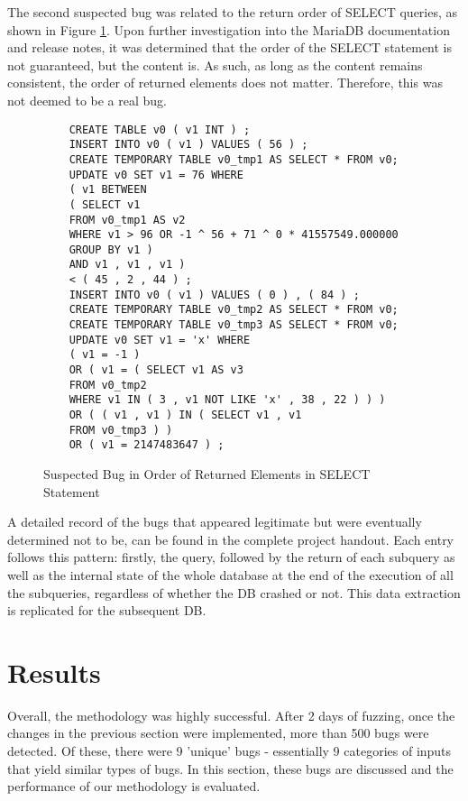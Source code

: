 \documentclass[sigconf]{acmart}
\begin{document}
The second suspected bug was related to the return order of SELECT queries, as shown in Figure \ref{fig:bug_order}. Upon further investigation into the MariaDB documentation and release notes, it was determined that the order of the SELECT statement is not guaranteed, but the content is. As such, as long as the content remains consistent, the order of returned elements does not matter. Therefore, this was not deemed to be a real bug.
\begin{figure}[h]
    \centering
    \begin{verbatim}
    CREATE TABLE v0 ( v1 INT ) ;
    INSERT INTO v0 ( v1 ) VALUES ( 56 ) ;
    CREATE TEMPORARY TABLE v0_tmp1 AS SELECT * FROM v0;
    UPDATE v0 SET v1 = 76 WHERE
    ( v1 BETWEEN
    ( SELECT v1
    FROM v0_tmp1 AS v2
    WHERE v1 > 96 OR -1 ^ 56 + 71 ^ 0 * 41557549.000000
    GROUP BY v1 )
    AND v1 , v1 , v1 )
    < ( 45 , 2 , 44 ) ;
    INSERT INTO v0 ( v1 ) VALUES ( 0 ) , ( 84 ) ;
    CREATE TEMPORARY TABLE v0_tmp2 AS SELECT * FROM v0;
    CREATE TEMPORARY TABLE v0_tmp3 AS SELECT * FROM v0;
    UPDATE v0 SET v1 = 'x' WHERE
    ( v1 = -1 )
    OR ( v1 = ( SELECT v1 AS v3
    FROM v0_tmp2
    WHERE v1 IN ( 3 , v1 NOT LIKE 'x' , 38 , 22 ) ) )
    OR ( ( v1 , v1 ) IN ( SELECT v1 , v1
    FROM v0_tmp3 ) )
    OR ( v1 = 2147483647 ) ;
    \end{verbatim}
    \caption{Suspected Bug in Order of Returned Elements in SELECT Statement}
    \label{fig:bug_order}
    \end{figure}
A detailed record of the bugs that appeared legitimate but were eventually determined not to be, can be found in the complete project handout. Each entry follows this pattern: firstly, the query, followed by the return of each subquery as well as the internal state of the whole database at the end of the execution of all the subqueries, regardless of whether the DB crashed or not. This data extraction is replicated for the subsequent DB.



\section{Results}
Overall, the methodology was highly successful. After 2 days of fuzzing, once the changes in the previous section were implemented, more than 500 bugs were detected. Of these, there were 9 'unique' bugs - essentially 9 categories of inputs that yield similar types of bugs. In this section, these bugs are discussed and the performance of our methodology is evaluated.
\end{document}
